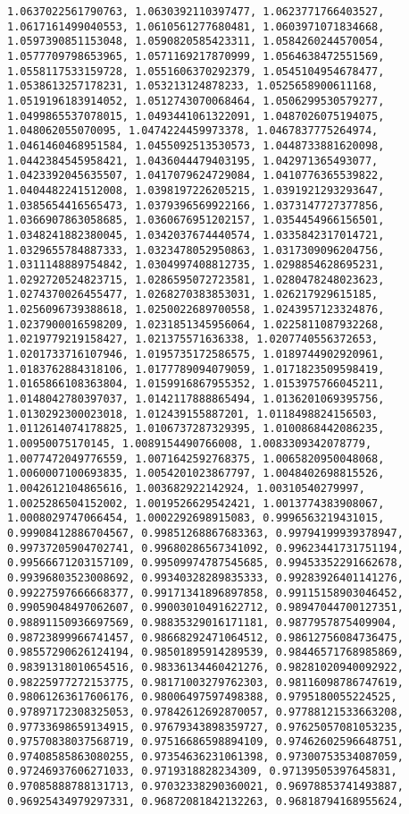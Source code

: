 \documentclass[11pt]{article}
\begin{document}
\begin{Verbatim}[commandchars=\\\{\}]
1.0637022561790763, 1.0630392110397477, 1.0623771766403527, 1.0617161499040553, 1.0610561277680481, 1.0603971071834668, 1.0597390851153048, 1.0590820585423311, 1.0584260244570054, 1.0577709798653965, 1.0571169217870999, 1.0564638472551569, 1.0558117533159728, 1.0551606370292379, 1.0545104954678477, 1.0538613257178231, 1.053213124878233, 1.0525658900611168, 1.0519196183914052, 1.0512743070068464, 1.0506299530579277, 1.0499865537078015, 1.0493441061322091, 1.0487026075194075, 1.048062055070095, 1.0474224459973378, 1.0467837775264974, 1.0461460468951584, 1.0455092513530573, 1.0448733881620098, 1.0442384545958421, 1.0436044479403195, 1.042971365493077, 1.0423392045635507, 1.0417079624729084, 1.0410776365539822, 1.0404482241512008, 1.0398197226205215, 1.0391921293293647, 1.0385654416565473, 1.0379396569922166, 1.0373147727377856, 1.0366907863058685, 1.0360676951202157, 1.0354454966156501, 1.0348241882380045, 1.0342037674440574, 1.0335842317014721, 1.0329655784887333, 1.0323478052950863, 1.0317309096204756, 1.0311148889754842, 1.0304997408812735, 1.0298854628695231, 1.0292720524823715, 1.0286595072723581, 1.0280478248023623, 1.0274370026455477, 1.0268270383853031, 1.026217929615185, 1.0256096739388618, 1.0250022689700558, 1.0243957123324876, 1.0237900016598209, 1.0231851345956064, 1.0225811087932268, 1.0219779219158427, 1.021375571636338, 1.0207740556372653, 1.0201733716107946, 1.0195735172586575, 1.0189744902920961, 1.0183762884318106, 1.0177789094079059, 1.0171823509598419, 1.0165866108363804, 1.0159916867955352, 1.0153975766045211, 1.0148042780397037, 1.0142117888865494, 1.0136201069395756, 1.0130292300023018, 1.012439155887201, 1.0118498824156503, 1.0112614074178825, 1.0106737287329395, 1.0100868442086235, 1.00950075170145, 1.0089154490766008, 1.0083309342078779, 1.0077472049776559, 1.0071642592768375, 1.0065820950048068, 1.0060007100693835, 1.0054201023867797, 1.0048402698815526, 1.0042612104865616, 1.003682922142924, 1.00310540279997, 1.0025286504152002, 1.0019526629542421, 1.0013774383908067, 1.0008029747066454, 1.0002292698915083, 0.9996563219431015, 0.99908412886704567, 0.99851268867683363, 0.99794199939378947, 0.99737205904702741, 0.99680286567341092, 0.99623441731751194, 0.99566671203157109, 0.99509974787545685, 0.99453352291662678, 0.99396803523008692, 0.99340328289835333, 0.99283926401141276, 0.99227597666668377, 0.99171341896897858, 0.99115158903046452, 0.99059048497062607, 0.99003010491622712, 0.98947044700127351, 0.98891150936697569, 0.98835329016171181, 0.9877957875409904, 0.98723899966741457, 0.98668292471064512, 0.98612756084736475, 0.98557290626124194, 0.98501895914289539, 0.98446571768985869, 0.98391318010654516, 0.98336134460421276, 0.98281020940092922, 0.98225977272153775, 0.98171003279762303, 0.98116098786747619, 0.98061263617606176, 0.98006497597498388, 0.9795180055224525, 0.97897172308325053, 0.97842612692870057, 0.97788121533663208, 0.97733698659134915, 0.97679343898359727, 0.97625057081053235, 0.97570838037568719, 0.97516686598894109, 0.97462602596648751, 0.97408585863080255, 0.97354636231061398, 0.97300753534087059, 0.97246937606271033, 0.9719318828234309, 0.97139505397645831, 0.97085888788131713, 0.97032338290360021, 0.96978853741493887, 0.96925434979297331, 0.96872081842132263, 0.96818794168955624, 
\end{Verbatim}
\end{document}
